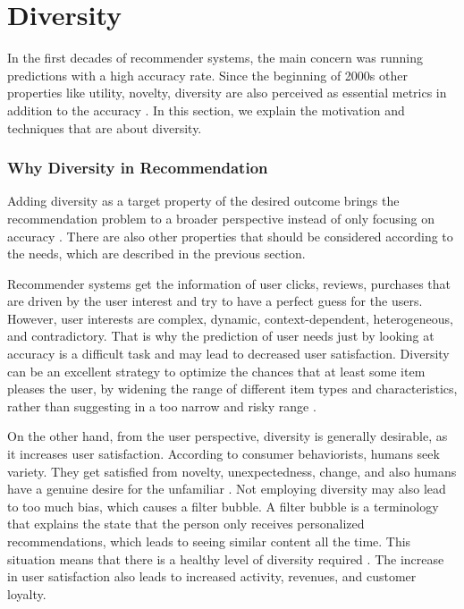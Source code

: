 
\section{Diversity}\label{section:novelty_and_diversity}

In the first decades of recommender systems, the main concern was running predictions with a high accuracy rate. Since the beginning of 2000s other properties like utility, novelty, diversity are also perceived as essential metrics in addition to the accuracy \cite{Hurley:2011:NDT:1944339.1944341}. In this section, we explain the motivation and techniques that are about diversity. 

\subsubsection{Why Diversity in Recommendation}

Adding diversity as a target property of the desired outcome brings the recommendation problem to a broader perspective instead of only focusing on accuracy \cite{McNee:2006:AEA:1125451.1125659}. There are also other properties that should be considered according to the needs, which are described in the previous section. 

Recommender systems get the information of user clicks, reviews, purchases that are driven by the user interest and try to have a perfect guess for the users. However, user interests are complex, dynamic, context-dependent, heterogeneous, and contradictory. That is why the prediction of user needs just by looking at accuracy is a difficult task and may lead to decreased user satisfaction. Diversity can be an excellent strategy to optimize the chances that at least some item pleases the user, by widening the range of different item types and characteristics, rather than suggesting in a too narrow and risky range \cite{castells2015novelty}.

On the other hand, from the user perspective, diversity is generally desirable, as it increases user satisfaction. According to consumer behaviorists, humans seek variety. They get satisfied from novelty, unexpectedness, change, and also humans have a genuine desire for the unfamiliar \cite{castells2015novelty}. Not employing diversity may also lead to too much bias, which causes a filter bubble. A filter bubble is a terminology that explains the state that the person only receives personalized recommendations, which leads to seeing similar content all the time. This situation means that there is a healthy level of diversity required \cite{Nguyen:2014:EFB:2566486.2568012}. The increase in user satisfaction also leads to increased activity, revenues, and customer loyalty.

